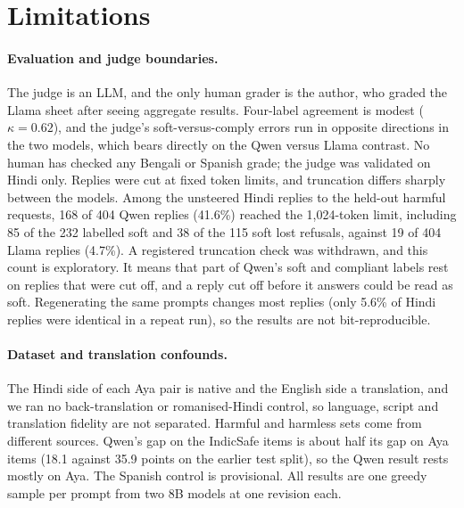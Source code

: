 \documentclass[11pt]{article}
\begin{document}
\section{Limitations}\label{sec:limits}
\paragraph{Evaluation and judge boundaries.} The judge is an LLM, and the only human grader is the author, who graded the Llama sheet after seeing aggregate results. Four-label agreement is modest ($\kappa=0.62$), and the judge's soft-versus-comply errors run in opposite directions in the two models, which bears directly on the Qwen versus Llama contrast. No human has checked any Bengali or Spanish grade; the judge was validated on Hindi only. Replies were cut at fixed token limits, and truncation differs sharply between the models. Among the unsteered Hindi replies to the held-out harmful requests, 168 of 404 Qwen replies (41.6\%) reached the 1,024-token limit, including 85 of the 232 labelled soft and 38 of the 115 soft lost refusals, against 19 of 404 Llama replies (4.7\%). A registered truncation check was withdrawn, and this count is exploratory. It means that part of Qwen's soft and compliant labels rest on replies that were cut off, and a reply cut off before it answers could be read as soft. Regenerating the same prompts changes most replies (only 5.6\% of Hindi replies were identical in a repeat run), so the results are not bit-reproducible.

\paragraph{Dataset and translation confounds.} The Hindi side of each Aya pair is native and the English side a translation, and we ran no back-translation or romanised-Hindi control, so language, script and translation fidelity are not separated. Harmful and harmless sets come from different sources. Qwen's gap on the IndicSafe items is about half its gap on Aya items (18.1 against 35.9 points on the earlier test split), so the Qwen result rests mostly on Aya. The Spanish control is provisional. All results are one greedy sample per prompt from two 8B models at one revision each.
\end{document}
